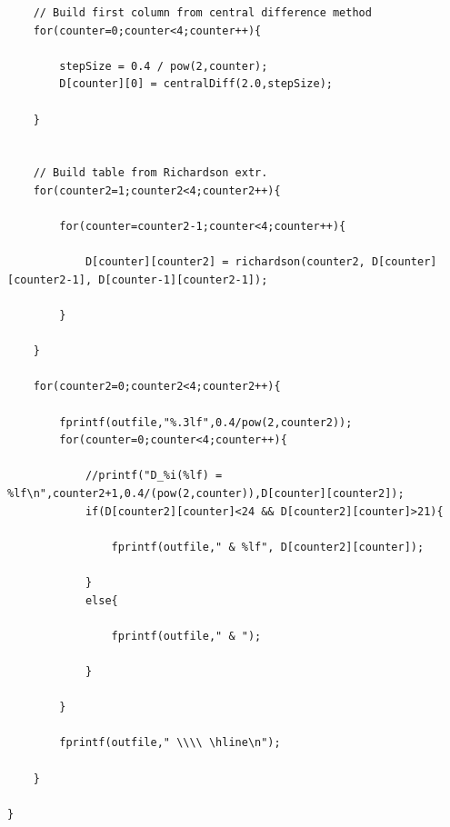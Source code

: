 \documentclass[12pt]{article}
\begin{document}
\begin{verbatim}
	// Build first column from central difference method
	for(counter=0;counter<4;counter++){

		stepSize = 0.4 / pow(2,counter);
		D[counter][0] = centralDiff(2.0,stepSize);
	
	}


	// Build table from Richardson extr.
	for(counter2=1;counter2<4;counter2++){

		for(counter=counter2-1;counter<4;counter++){

			D[counter][counter2] = richardson(counter2, D[counter][counter2-1], D[counter-1][counter2-1]);

		}

	}

	for(counter2=0;counter2<4;counter2++){

		fprintf(outfile,"%.3lf",0.4/pow(2,counter2));
		for(counter=0;counter<4;counter++){

			//printf("D_%i(%lf) = %lf\n",counter2+1,0.4/(pow(2,counter)),D[counter][counter2]);
			if(D[counter2][counter]<24 && D[counter2][counter]>21){

				fprintf(outfile," & %lf", D[counter2][counter]);
			
			}
			else{

				fprintf(outfile," & ");

			}

		}

		fprintf(outfile," \\\\ \hline\n");

	}

}
\end{verbatim}
\end{document}
